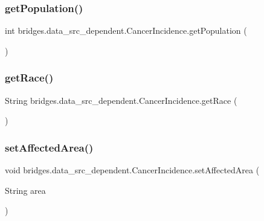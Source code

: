 \subsubsection{\texorpdfstring{get\+Population()}{getPopulation()}}
{\footnotesize\ttfamily int bridges.\+data\+\_\+src\+\_\+dependent.\+Cancer\+Incidence.\+get\+Population (\begin{DoxyParamCaption}{ }\end{DoxyParamCaption})}

\hypertarget{classbridges_1_1data__src__dependent_1_1_cancer_incidence_a18de1c14d36cd7656555c8465ea8a009}{}\label{classbridges_1_1data__src__dependent_1_1_cancer_incidence_a18de1c14d36cd7656555c8465ea8a009} 
\subsubsection{\texorpdfstring{get\+Race()}{getRace()}}
{\footnotesize\ttfamily String bridges.\+data\+\_\+src\+\_\+dependent.\+Cancer\+Incidence.\+get\+Race (\begin{DoxyParamCaption}{ }\end{DoxyParamCaption})}

\hypertarget{classbridges_1_1data__src__dependent_1_1_cancer_incidence_a9c7f2d303da9498e5e6145439c5a6fbc}{}\label{classbridges_1_1data__src__dependent_1_1_cancer_incidence_a9c7f2d303da9498e5e6145439c5a6fbc} 
\subsubsection{\texorpdfstring{set\+Affected\+Area()}{setAffectedArea()}}
{\footnotesize\ttfamily void bridges.\+data\+\_\+src\+\_\+dependent.\+Cancer\+Incidence.\+set\+Affected\+Area (\begin{DoxyParamCaption}\item[{String}]{area }\end{DoxyParamCaption})}

